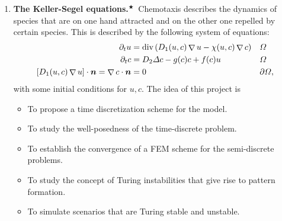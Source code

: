 \documentclass{article}
\renewcommand{\vec}{\vectorsym}
\DeclareMathOperator{\grad}{\nabla}
\DeclareMathOperator{\dive}{\text{div}}
\newcommand{\master}{$^\bigstar$}
\begin{document}
\begin{enumerate}
    \item \textbf{The Keller-Segel equations.}\master\ Chemotaxis describes the dynamics of species that are on one hand attracted and on the other one repelled by certain species. This is described by the following system of equations: 
        $$\begin{aligned}
            \partial_t u &= \dive\left(D_1(u,c)\grad u - \chi(u,c) \grad c\right) && \Omega \\
            \partial_t c &= D_2\Delta c - g(c) c + f(c) u && \Omega \\
            [D_1(u,c)\grad u]\cdot \vec n = \grad c\cdot \vec n &= 0 && \partial \Omega,
        \end{aligned} $$
        with some initial conditions for $u,c$. The idea of this project is
        \begin{itemize}
            \item To propose a time discretization scheme for the model.
            \item To study the well-posedness of the time-discrete problem.
            \item To establish the convergence of a FEM scheme for the semi-discrete problems.
            \item To study the concept of Turing instabilities that give rise to pattern formation.
            \item To simulate scenarios that are Turing stable and unstable.
        \end{itemize}


\end{enumerate}
\end{document}
